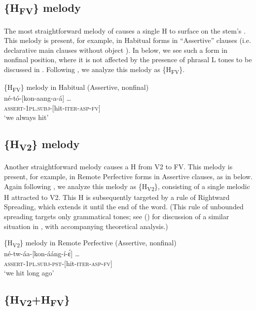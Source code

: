 \documentclass[output=paper,newtxmath,modfonts,nonflat,hidelinks]{langsci/langscibook}
\begin{document}
\subsection{\{H\textsubscript{FV}\} melody}\label{sec:jones:3.2}

The most straightforward melody of  causes a single H  to surface on the stem’s . This melody is present, for example, in Habitual forms in “Assertive” clauses (i.e. declarative main clauses without object ). In  below, we see such a form in nonfinal position, where it is not affected by the presence of phrasal L tones to be discussed in . Following \citet{Roberts-Kohno2014}, we analyze this melody as \{H\textsubscript{FV}\}.

\ea\label{ex:jones:3}
{\{H\textsubscript{FV}\} melody in Habitual (Assertive, nonfinal)}\\
\gll   né-tó-[kon-aang-a-á] …      \\
     \textsc{assert-1pl.subj-[}hit-\textsc{iter-asp-fv]}\\
\glt ‘we always hit’
\z

\subsection{\{H\textsubscript{V2}\} melody}\label{sec:jones:3.3}

Another straightforward melody causes a H  from V2 to FV. This melody is present, for example, in Remote Perfective forms in Assertive clauses, as in  below. Again following \citet{Roberts-Kohno2014}, we analyze this melody as \{H\textsubscript{V2}\}, consisting of a single melodic H  attracted to V2. This H is subsequently targeted by a rule of Rightward Spreading, which extends it until the end of the word. (This rule of unbounded spreading targets only grammatical tones; see \citeauthor{Bickmore1997} (\citeyear{Bickmore1997,Bickmore1999}) for discussion of a similar situation in , with accompanying theoretical analysis.)

\ea\label{ex:jones:4}
{\{H\textsubscript{V2}\} melody in Remote Perfective (Assertive, nonfinal)}\\
\gll   né-tw-áa-[kon-ááng-í-\'ɛ] …      \\
       \textsc{assert-1pl.subj-pst-[}hit-\textsc{iter-asp-fv]}\\
\glt   ‘we hit long ago’
\z

\subsection{\{H\textsubscript{V2}+H\textsubscript{FV}\}}\label{sec:jones:3.4}
\end{document}

